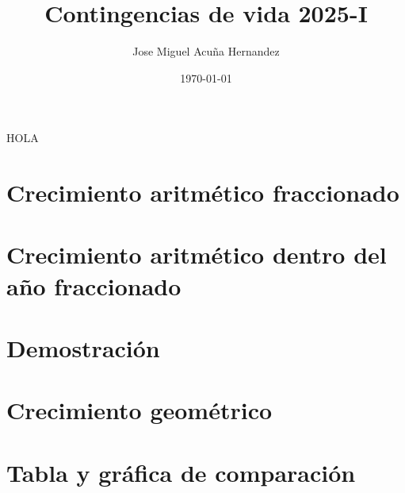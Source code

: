 \documentclass{article}
\title{Contingencias de vida 2025-I}
\author{Jose Miguel Acuña Hernandez}
\date{\today}
\begin{document}
\thispagestyle{firstpage}
\vspace*{9\baselineskip}

\renewcommand{\contentsname}{}
\begin{cuadrocontenido}
  \tableofcontents
\end{cuadrocontenido}

HOLA

\section{Crecimiento aritmético fraccionado}
%

\section{Crecimiento aritmético dentro del año fraccionado}
%

\section{Demostración}
%

\section{Crecimiento geométrico}
%
    
\section{Tabla y gráfica de comparación}
%
\end{document}
